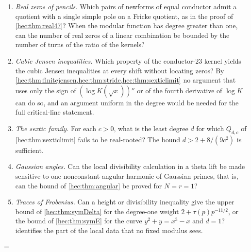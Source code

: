 \begin{enumerate}[label=\textup{(\arabic*)}]
explicit fields can the real-axis hypothesis be proved by positivity of the Mellin kernel of every
constituent, as in \cref{hec:prop:pos71}?
\item \emph{Real zeros of pencils.} Which pairs of newforms of equal conductor admit a quotient with a
single simple pole on a Fricke quotient, as in the proof of \cref{hec:thm:real47}? When the modular
function has degree greater than one, can the number of real zeros of a linear combination be bounded by
the number of turns of the ratio of the kernels?
\item \emph{Cubic Jensen inequalities.} Which property of the conductor-$23$ kernel yields the cubic
Jensen inequalities at every shift without locating zeros? By
\cref{hec:thm:finitejensen,hec:thm:stride,hec:thm:sexticlimit} no argument that uses only the sign of
$(\log K(\sqrt x))''$ or of the fourth derivative of $\log K$ can do so, and an argument uniform in the
degree would be needed for the full critical-line statement.
\item \emph{The sextic family.} For each $c>0$, what is the least degree $d$ for which $Q_{d,c}$ of
\cref{hec:thm:sexticlimit} fails to be real-rooted? The bound $d>2+8/(9c^2)$ is sufficient.
\item \emph{Gaussian angles.} Can the local divisibility calculation in a theta lift be made sensitive to
one nonconstant angular harmonic of Gaussian primes, that is, can the bound of \cref{hec:thm:angular} be
proved for $N=r=1$?
\item \emph{Traces of Frobenius.} Can a height or divisibility inequality give the upper bound of
\cref{hec:thm:symDelta} for the degree-one weight $2+\tau(p)p^{-11/2}$, or the bound of \cref{hec:thm:symE}
for the curve $y^2+y=x^3-x$ and $d=1$?  identifies the part of the local data that no
fixed modulus sees.
\end{enumerate}

\emergencystretch=\hecsavedemergencystretch\relax

